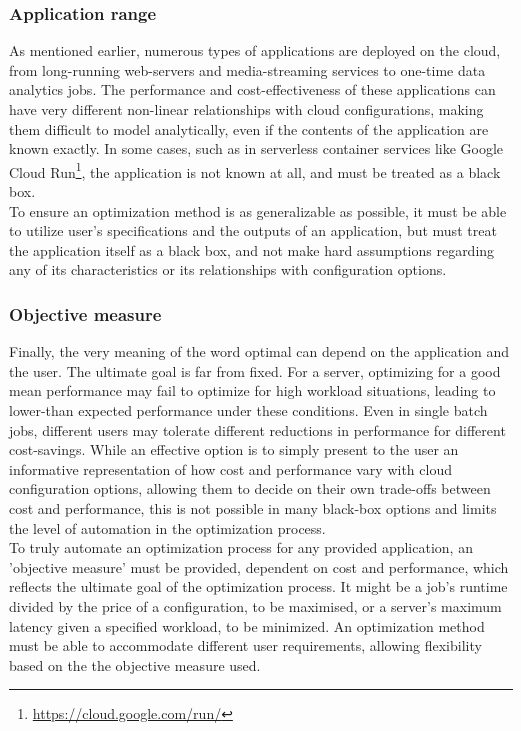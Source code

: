 \documentclass{report}
\begin{document}
\subsubsection{Application range}
As mentioned earlier, numerous types of applications are deployed on the cloud, from long-running web-servers and media-streaming services to one-time data analytics jobs. The performance and cost-effectiveness of these applications can have very different non-linear relationships with cloud configurations, making them difficult to model analytically, even if the contents of the application are known exactly. In some cases, such as in serverless container services like Google Cloud Run\footnote{\url{https://cloud.google.com/run/}}, the application is not known at all, and must be treated as a black box. \\
To ensure an optimization method is as generalizable as possible, it must be able to utilize user's specifications and the outputs of an application, but must treat the application itself as a black box, and not make hard assumptions regarding any of its characteristics or its relationships with configuration options.
\subsubsection{Objective measure}
Finally, the very meaning of the word optimal can depend on the application and the user. The ultimate goal is far from fixed. For a server, optimizing for a good mean performance may fail to optimize for high workload situations, leading to lower-than expected performance under these conditions. Even in single batch jobs, different users may tolerate different reductions in performance for different cost-savings. While an effective option is to simply present to the user an informative representation of how cost and performance vary with cloud configuration options, allowing them to decide on their own trade-offs between cost and performance, this is not possible in many black-box options and limits the level of automation in the optimization process.\\
To truly automate an optimization process for any provided application, an 'objective measure' must be provided, dependent on cost and performance, which reflects the ultimate goal of the optimization process. It might be a job's runtime divided by the price of a configuration, to be maximised, or a server's maximum latency given a specified workload, to be minimized. An optimization method must be able to accommodate different user requirements, allowing flexibility based on the the objective measure used.
\end{document}
